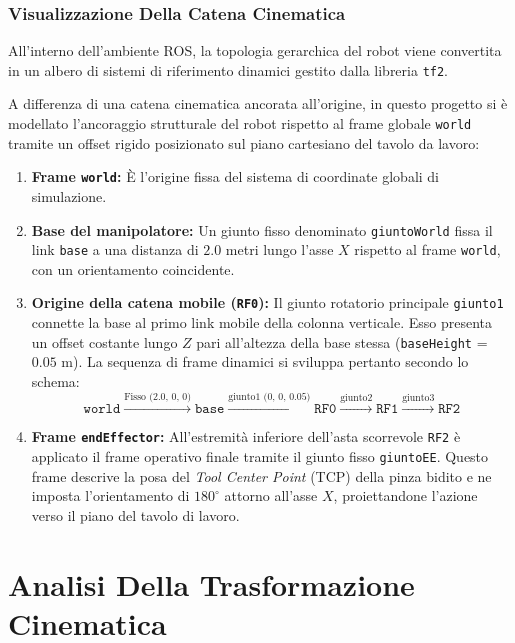 \documentclass[11pt, a4paper]{report}
\begin{document}
\subsection{Visualizzazione Della Catena Cinematica}
\label{subsec:catena_cinematica_world}

All'interno dell'ambiente ROS, la topologia gerarchica del robot viene convertita in un albero di sistemi di riferimento dinamici gestito dalla libreria \texttt{tf2}.

A differenza di una catena cinematica ancorata all'origine, in questo progetto si è modellato l'ancoraggio strutturale del robot rispetto al frame globale \texttt{world} tramite un offset rigido posizionato sul piano cartesiano del tavolo da lavoro:
\begin{enumerate}
    \item \textbf{Frame \texttt{world}:} È l'origine fissa del sistema di coordinate globali di simulazione.
    \item \textbf{Base del manipolatore:} Un giunto fisso denominato \texttt{giuntoWorld} fissa il link \texttt{base} a una distanza di $2.0$ metri lungo l'asse $X$ rispetto al frame \texttt{world}, con un orientamento coincidente.
    \item \textbf{Origine della catena mobile (\texttt{RF0}):} Il giunto rotatorio principale \texttt{giunto1} connette la base al primo link mobile della colonna verticale. Esso presenta un offset costante lungo $Z$ pari all'altezza della base stessa (\texttt{baseHeight} = $0.05$ m). La sequenza di frame dinamici si sviluppa pertanto secondo lo schema:
    \[
        \texttt{world} \xrightarrow{\text{Fisso (2.0, 0, 0)}} \texttt{base} \xrightarrow{\text{giunto1 (0, 0, 0.05)}} \texttt{RF0} \xrightarrow{\text{giunto2}} \texttt{RF1} \xrightarrow{\text{giunto3}} \texttt{RF2}
    \]
    \item \textbf{Frame \texttt{endEffector}:} All'estremità inferiore dell'asta scorrevole \texttt{RF2} è applicato il frame operativo finale tramite il giunto fisso \texttt{giuntoEE}. Questo frame descrive la posa del \textit{Tool Center Point} (TCP) della pinza bidito e ne imposta l'orientamento di $180^\circ$ attorno all'asse $X$, proiettandone l'azione verso il piano del tavolo di lavoro.
\end{enumerate}





\chapter{Analisi Della Trasformazione Cinematica}
\label{chap:analisi_cinematica}
\end{document}
